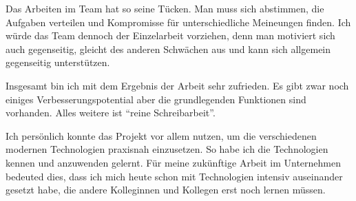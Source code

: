 Das Arbeiten im Team hat so seine Tücken.
Man muss sich abstimmen, die Aufgaben verteilen und Kompromisse für unterschiedliche Meineungen finden.
Ich würde das Team dennoch der Einzelarbeit vorziehen, denn man motiviert sich auch gegenseitig,
gleicht des anderen Schwächen aus und kann sich allgemein gegenseitig unterstützen.

Insgesamt bin ich mit dem Ergebnis der Arbeit sehr zufrieden.
Es gibt zwar noch einiges Verbesserungspotential aber die grundlegenden Funktionen sind vorhanden.
Alles weitere ist \enquote{reine Schreibarbeit}.

Ich persönlich konnte das Projekt vor allem nutzen, um die verschiedenen modernen Technologien praxisnah einzusetzen.
So habe ich die Technologien kennen und anzuwenden gelernt.
Für meine zukünftige Arbeit im Unternehmen bedeuted dies,
dass ich mich heute schon mit Technologien intensiv auseinander gesetzt habe,
die andere Kolleginnen und Kollegen erst noch lernen müssen.